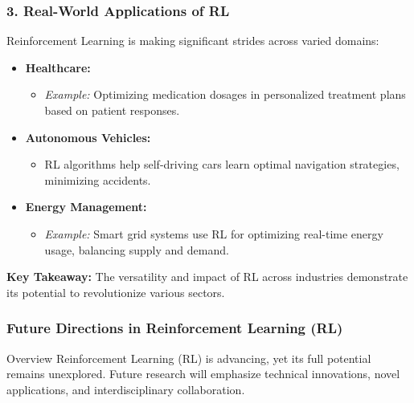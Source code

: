 \documentclass[aspectratio=169]{beamer}
\begin{document}
\begin{frame}[fragile]
    \frametitle{3. Real-World Applications of RL}
    Reinforcement Learning is making significant strides across varied domains:
    \begin{itemize}
        \item \textbf{Healthcare:}
        \begin{itemize}
            \item \textit{Example:} Optimizing medication dosages in personalized treatment plans based on patient responses.
        \end{itemize}
        \item \textbf{Autonomous Vehicles:}
        \begin{itemize}
            \item RL algorithms help self-driving cars learn optimal navigation strategies, minimizing accidents.
        \end{itemize}
        \item \textbf{Energy Management:}
        \begin{itemize}
            \item \textit{Example:} Smart grid systems use RL for optimizing real-time energy usage, balancing supply and demand.
        \end{itemize}
    \end{itemize}
    \textbf{Key Takeaway:} The versatility and impact of RL across industries demonstrate its potential to revolutionize various sectors.
\end{frame}

\begin{frame}[fragile]
    \frametitle{Future Directions in Reinforcement Learning (RL)}
    \begin{block}{Overview}
        Reinforcement Learning (RL) is advancing, yet its full potential remains unexplored. Future research will emphasize technical innovations, novel applications, and interdisciplinary collaboration.
    \end{block}
\end{frame}
\end{document}
